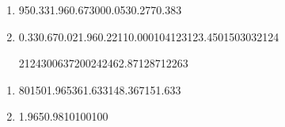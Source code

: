 \begin{question}
    
    \begin{enumerate}[label={\textbf{\alph*)}}]

        \item 
        
             \begin{formula3}
                {95}{0.33}{1.96}{0.67}{300}{0.053}{0.277}{0.383}
             \end{formula3}

        \item 
            
            \begin{formula4}
                {0.33}{0.67}{0.02}{1.96}{0.2211}{0.000104123}{123.450150303}{2124}
            \end{formula4}

            \begin{formula5}
                {2124}{300}{637200}{2424}{62.87128712}{263}
            \end{formula5}

    \end{enumerate}
\end{question}


\begin{question}
    
    \begin{enumerate}[label={\textbf{\alph*)}}]

        \item 
              \begin{formula1}
                {80}{150}{1.96}{5}{36}{1.633}{148.367}{151.633}
              \end{formula1}
        \item 
              
              \begin{formula6}
                {1.96}{5}{0.98}{10}{100}{100}
              \end{formula6}
    \end{enumerate}
\end{question}


